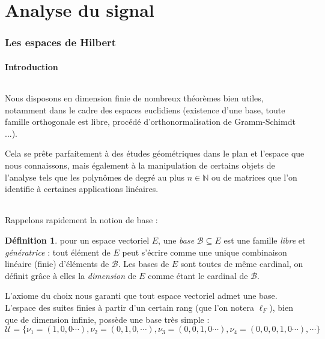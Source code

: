 \documentclass[]{article}
\theoremstyle{remark}
\theoremstyle{definition}
\newtheorem{mydef}{Définition}
\begin{document}
	\part{Analyse du signal}
	\section{Les espaces de Hilbert}
	\subsection{Introduction}

	\paragraph*{}
	
	Nous disposons en dimension finie de nombreux théorèmes bien utiles, notamment dans le cadre des espaces euclidiens (existence d'une base, toute famille orthogonale est libre, procédé d'orthonormalisation de Gramm-Schimdt ...).
	
	Cela se prête parfaitement à des études géométriques dans le plan et l'espace que nous connaissons, mais également à la manipulation de certains objets de l'analyse tels que les polynômes de degré au plus $n \in \mathbb{N}$ ou de matrices que l'on identifie à certaines applications linéaires.
	
	\paragraph*{}
	
	Rappelons rapidement la notion de base :
	
	\begin{mydef}
		pour un espace vectoriel $E$, une \textit{base} $\mathcal{B} \subseteq E$ est une famille \textit{libre} et \textit{génératrice} : tout élément de $E$ peut s'écrire comme une unique combinaison linéaire (finie) d'éléments de $\mathcal{B}$. Les bases de $E$ sont toutes de même cardinal, on définit grâce à elles la \textit{dimension} de $E$ comme étant le cardinal de $\mathcal{B}$.
	\end{mydef}
	
	L'axiome du choix nous garanti que tout espace vectoriel admet une base. L'espace des suites finies à partir d'un certain rang (que l'on notera $\ell_F$), bien que de dimension infinie, possède une base très simple : $$\mathcal{U} = \{\nu_1 = (1, 0, 0 \cdots), \nu_2 = (0, 1, 0, \cdots), \nu_3 = (0, 0, 1, 0 \cdots), \nu_4 = (0, 0, 0, 1, 0 \cdots), \cdots\}$$
	
\end{document}
